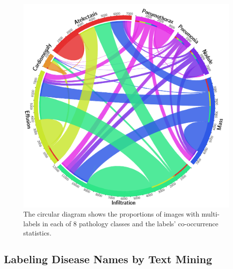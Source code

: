 \documentclass[10pt,twocolumn,letterpaper]{article}
\begin{document}
\begin{figure}[t]
	\centering
	\includegraphics[width=1\columnwidth]{circos-table.png}
	\caption{The circular diagram shows the proportions of images with multi-labels in each of 8 pathology classes and the labels' co-occurrence statistics.}
	\label{fig:keywords_statistics}
\end{figure}

\subsection{Labeling Disease Names by Text Mining}
\end{document}
